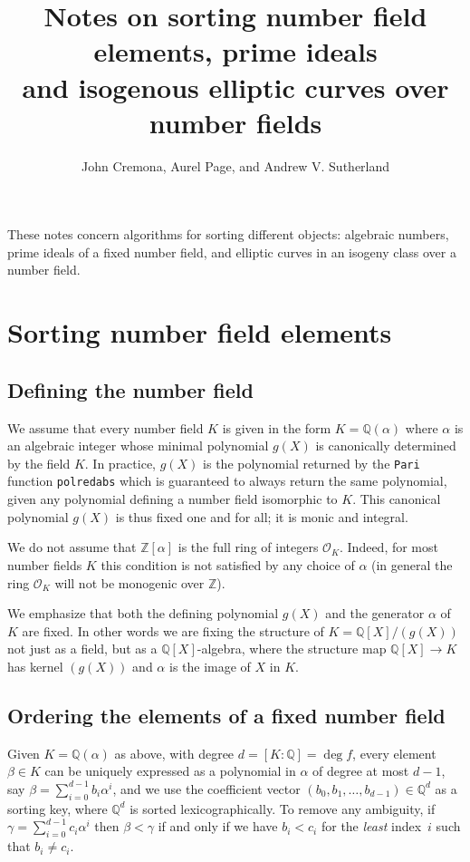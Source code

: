\documentclass{article}
\title{Notes on sorting number field elements, prime ideals\\and
  isogenous elliptic curves over number fields}
\author{John Cremona, Aurel Page, and Andrew V. Sutherland}
\def\Z{{\mathbb Z}}
\def\Q{{\mathbb Q}}
\def\OO{{\mathcal O}}
\begin{document}
\maketitle

These notes concern algorithms for sorting different objects:
algebraic numbers, prime ideals of a fixed number field, and elliptic
curves in an isogeny class over a number field.

\section{Sorting number field elements}
\subsection{Defining the number field}
We assume that every number field $K$ is given in the form
$K=\Q(\alpha)$ where $\alpha$ is an algebraic integer whose
minimal polynomial $g(X)$ is canonically determined by the field $K$.
In practice, $g(X)$ is the
polynomial returned by the {\tt Pari} function {\tt polredabs} which
is guaranteed to always return the same polynomial, given any
polynomial defining a number field isomorphic to $K$.  This canonical
polynomial $g(X)$ is thus fixed one and for all; it is monic and
integral.

We do not assume that $\Z[\alpha]$ is the full ring of integers
$\OO_K$.  Indeed, for most number fields $K$ this condition is
not satisfied by any choice of $\alpha$ (in general the ring $\OO_K$
will not be monogenic over $\Z$).

We emphasize that both the defining polynomial $g(X)$ and the generator
$\alpha$ of~$K$ are fixed.  In other words we are fixing the structure
of $K=\Q[X]/(g(X))$ not just as a field, but as a $\Q[X]$-algebra, where the
structure map $\Q[X]\to K$ has kernel $(g(X))$ and $\alpha$ is the
image of $X$ in $K$.

\subsection{Ordering the elements of a fixed number field}\label{sec:ordfix}
Given $K=\Q(\alpha)$ as above, with degree $d=[K:\Q]=\deg f$, every
element $\beta\in K$ can be uniquely expressed as a polynomial in
$\alpha$ of degree at most $d-1$, say
$\beta=\sum_{i=0}^{d-1}b_i\alpha^i$, and we use the coefficient vector
$(b_0,b_1,\dots,b_{d-1})\in\Q^d$ as a sorting key, where $\Q^d$ is
sorted lexicographically.  To remove any ambiguity, if
$\gamma=\sum_{i=0}^{d-1}c_i\alpha^i$ then $\beta<\gamma$ if and only
if we have $b_i<c_i$ for the \textit{least} index~$i$ such that $b_i\not=c_i$.
\end{document}
